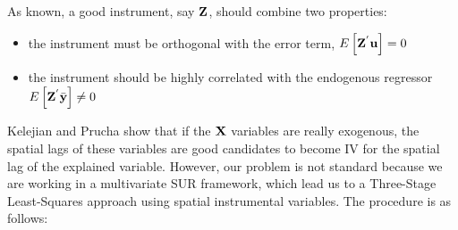 \documentclass[article]{jss}
\providecommand{\tightlist}{%
  \setlength{\itemsep}{0pt}\setlength{\parskip}{0pt}}
\begin{document}
As known, a good instrument, say \({\bf Z}\), should combine two properties:

\begin{itemize}
\tightlist
\item
  the instrument must be orthogonal with the error term,
  \(E\left[{\bf Z}^{'} {\bf u}\right]=0\)
\item
  the instrument should be highly correlated with the endogenous regressor
  \(E\left[{\bf Z}^{'} \bar{{\bf y}} \right] \neq 0\)
\end{itemize}

Kelejian and Prucha show that if the \({\bf X}\) variables are really exogenous, the spatial lags of these variables are good candidates to become IV for the spatial lag of the explained variable. However, our problem is not standard because we are working in a multivariate SUR framework, which lead us to a Three-Stage Least-Squares approach using spatial instrumental variables. The procedure is as follows:
\end{document}
